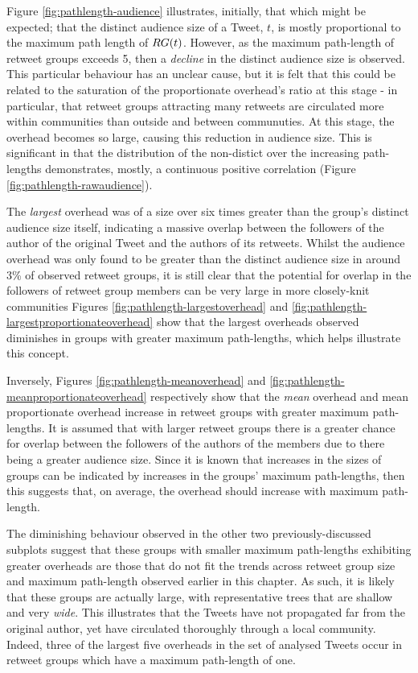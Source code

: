Figure \ref{fig:pathlength-audience} illustrates, initially, that which might be expected; that the distinct audience size of a Tweet, $t$, is mostly proportional to the maximum path length of $RG(t)$. However, as the maximum path-length of retweet groups exceeds 5, then a \textit{decline} in the distinct audience size is observed. This particular behaviour has an unclear cause, but it is felt that this could be related to the saturation of the proportionate overhead's ratio at this stage - in particular, that retweet groups attracting many retweets are circulated more within communities than outside and between communuties. At this stage, the overhead becomes so large, causing this reduction in audience size. This is significant in that the distribution of the non-distict over the increasing path-lengths demonstrates, mostly, a continuous positive correlation (Figure \ref{fig:pathlength-rawaudience}).

 

The \textit{largest} overhead was of a size over six times greater than the group's distinct audience size itself, indicating a massive overlap between the followers of the author of the original Tweet and the authors of its retweets. Whilst the audience overhead was only found to be greater than the distinct audience size in around 3\% of observed retweet groups, it is still clear that the potential for overlap in the followers of retweet group members can be very large in more closely-knit communities Figures \ref{fig:pathlength-largestoverhead} and \ref{fig:pathlength-largestproportionateoverhead} show that the largest overheads observed diminishes in groups with greater maximum path-lengths, which helps illustrate this concept.

Inversely, Figures \ref{fig:pathlength-meanoverhead} and \ref{fig:pathlength-meanproportionateoverhead} respectively show that the \textit{mean} overhead and mean proportionate overhead increase in retweet groups with greater maximum path-lengths. It is assumed that with larger retweet groups there is a greater chance for overlap between the followers of the authors of the members due to there being a greater audience size. Since it is known that increases in the sizes of groups can be indicated by increases in the groups' maximum path-lengths, then this suggests that, on average, the overhead should increase with maximum path-length. 

The diminishing behaviour observed in the other two previously-discussed subplots suggest that these groups with smaller maximum path-lengths exhibiting greater overheads are those that do not fit the trends across retweet group size and maximum path-length observed earlier in this chapter. As such, it is likely that these groups are actually large, with representative trees that are shallow and very \textit{wide}. This illustrates that the Tweets have not propagated far from the original author, yet have circulated thoroughly through a local community. Indeed, three of the largest five overheads in the set of analysed Tweets occur in retweet groups which have a maximum path-length of one. 


